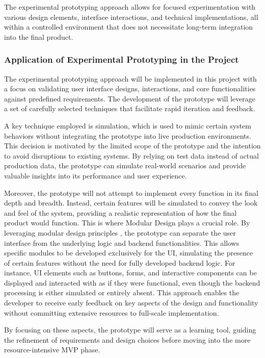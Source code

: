 The experimental prototyping approach allows for focused experimentation with various design elements, interface
interactions, and technical implementations, all within a controlled environment that does not necessitate long-term
integration into the final product.

\subsubsection{Application of Experimental Prototyping in the Project}\label{subsubsec:ptapplication}

The experimental prototyping approach will be implemented in this project with a focus on validating user interface
designs, interactions, and core functionalities against predefined requirements. The development of the prototype will
leverage a set of carefully selected techniques that facilitate rapid iteration and feedback.

A key technique employed is simulation, which is used to mimic certain system behaviors without integrating the
prototype into live production environments. This decision is motivated by the limited scope of the prototype and the
intention to avoid disruptions to existing systems. By relying on test data instead of actual production data, the
prototype can simulate real-world scenarios and provide valuable insights into its performance and user experience.

Moreover, the prototype will not attempt to implement every function in its final depth and breadth. Instead, certain
features will be simulated to convey the look and feel of the system, providing a realistic representation of how the
final product would function. This is where Modular Design plays a crucial role. By leveraging modular design principles
, the prototype can separate the user interface from the underlying logic and backend functionalities. This allows
specific modules to be developed exclusively for the UI, simulating the presence of certain features without the need
for fully developed backend logic. For instance, UI elements such as buttons, forms, and interactive components can be
displayed and interacted with as if they were functional, even though the backend processing is either simulated or
entirely absent. This approach enables the developer to receive early feedback on key aspects of the
design and functionality without committing extensive resources to full-scale implementation.

By focusing on these aspects, the prototype will serve as a learning tool, guiding the refinement of requirements and
design choices before moving into the more resource-intensive MVP phase.

